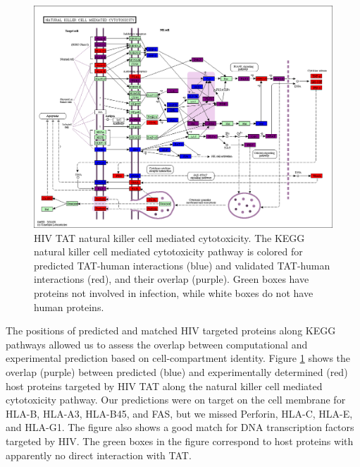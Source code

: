 \begin{figure}
\begin{center}
\includegraphics[scale=0.25]{figs/medGen_5}
\end{center}
\caption[HIV TAT natural killer cell mediated cytotoxicity]{\small HIV
  TAT natural killer cell mediated cytotoxicity. The KEGG natural
  killer cell mediated cytotoxicity pathway is colored for predicted
  TAT-human interactions (blue) and validated TAT-human interactions
  (red), and their overlap (purple). Green boxes have proteins not
  involved in infection, while white boxes do not have human
  proteins. \label{fig:medGen:fig5}}
\end{figure}

The positions of predicted and matched HIV targeted proteins along
KEGG pathways allowed us to assess the overlap between computational
and experimental prediction based on cell-compartment identity. Figure
\ref{fig:medGen:fig5} shows the overlap (purple) between predicted
(blue) and experimentally determined (red) host proteins targeted by
HIV TAT along the natural killer cell mediated cytotoxicity
pathway. Our predictions were on target on the cell membrane for
HLA-B, HLA-A3, HLA-B45, and FAS, but we missed Perforin, HLA-C, HLA-E,
and HLA-G1. The figure also shows a good match for DNA transcription
factors targeted by HIV. The green boxes in the figure correspond to
host proteins with apparently no direct interaction with TAT.

